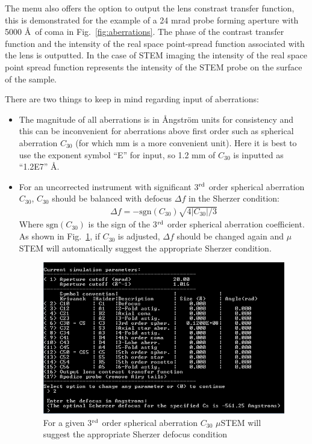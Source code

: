 \documentclass[12pt,a4paper]{article}
\begin{document}
The menu also offers the option to output the lens constrast transfer function, this is demonstrated for the example of a 24 mrad probe forming aperture with 5000 \AA\ of coma in Fig.~\ref{fig:aberrations}. The phase of the contrast transfer function and the intensity of the real space point-spread function associated with the lens is outputted. In the case of STEM imaging the intensity of the real space point spread function represents the intensity of the STEM probe on the surface of the sample.

There are two things to keep in mind regarding input of aberrations:
\begin{itemize}
	\item The magnitude of all aberrations is in \AA ngstr\"om units for consistency and this can be inconvenient for aberrations above first order such as spherical aberration $C_{30}$ (for which mm is a more convenient unit). Here it is best to use the exponent symbol ``E'' for input, so 1.2 mm of $C_{30}$ is inputted as ``1.2E7'' \AA.
	\item For an uncorrected instrument with significant 3$^{\rm rd}$ order spherical aberration $C_{30}$,  $C_{30}$ should be balanced with defocus $\Delta f $ in the Sherzer condition:
	\begin{align}
	\Delta f = -\mathrm{sgn}(C_{30})\sqrt{4|C_{30}|/3}
	\end{align}
	Where $\mathrm{sgn}(C_{30})$ is the sign of the 3$^{\rm rd}$ order spherical aberration coefficient. As shown in Fig.~\ref{fig:sherzer}, if $C_{30}$ is adjusted, $\Delta f $ should be changed again and $\mu$STEM will automatically suggest the appropriate Sherzer condition.
	\begin{figure}
		\includegraphics{figures/sherzer.png}
		\caption{For a given 3$^{\rm rd}$ order spherical aberration $C_{30}$ $\mu$STEM will suggest the appropriate Sherzer defocus condition\label{fig:sherzer}}
	\end{figure}
\end{itemize}
\end{document}
